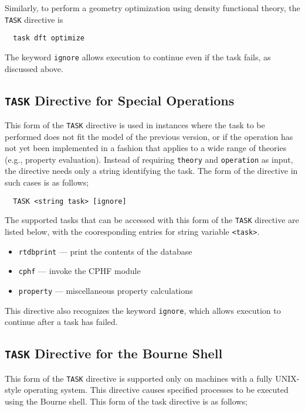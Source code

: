 Similarly, to perform a geometry optimization using density functional
theory, the \verb+TASK+ directive is
\begin{verbatim}
  task dft optimize
\end{verbatim}

The keyword \verb+ignore+ allows execution to continue even if the
task fails, as discussed above.

\subsection{{\tt TASK} Directive for Special Operations}

This form of the \verb+TASK+ directive is used in instances where the
task to be performed does not fit the model of the previous version, or
if the operation has not yet been implemented in a fashion that
applies to a wide range of theories (e.g., property evaluation).
Instead of requiring \verb+theory+ and \verb+operation+ as input, the
directive needs only a string identifying the task.  The form of the
directive in such cases is as follows;

\begin{verbatim}
  TASK <string task> [ignore]
\end{verbatim}

The supported tasks that can be accessed with this form of the \verb+TASK+
directive are listed
below, with the cooresponding entries for string variable \verb+<task>+.

\begin{itemize}
  \item \verb+rtdbprint+ --- print the contents of the database
  \item \verb+cphf+ --- invoke the CPHF module
  \item \verb+property+ --- miscellaneous property calculations
\end{itemize}

This directive also recognizes the keyword \verb+ignore+, which allows
execution to continue after a task has failed.

\subsection{{\tt TASK} Directive for the Bourne Shell}

This form of the \verb+TASK+ directive is supported only on machines
with a fully UNIX-style operating system.  This directive causes
specified processes to be executed using the Bourne shell.  This form
of the task directive is as follows;

